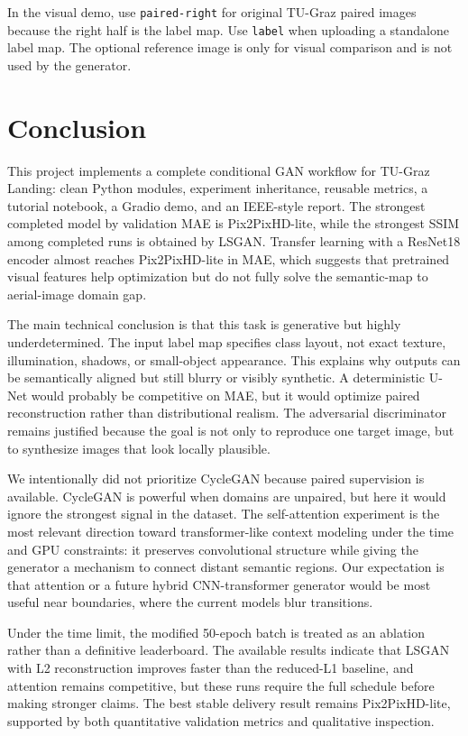 \documentclass[conference]{IEEEtran}
\newcommand{\code}[1]{\texttt{#1}}
\begin{document}
In the visual demo, use \code{paired-right} for original TU-Graz paired images because the right half is the label map. Use \code{label} when uploading a standalone label map. The optional reference image is only for visual comparison and is not used by the generator.


\section{Conclusion}
This project implements a complete conditional GAN workflow for TU-Graz Landing: clean Python modules, experiment inheritance, reusable metrics, a tutorial notebook, a Gradio demo, and an IEEE-style report. The strongest completed model by validation MAE is Pix2PixHD-lite, while the strongest SSIM among completed runs is obtained by LSGAN. Transfer learning with a ResNet18 encoder almost reaches Pix2PixHD-lite in MAE, which suggests that pretrained visual features help optimization but do not fully solve the semantic-map to aerial-image domain gap.

The main technical conclusion is that this task is generative but highly underdetermined. The input label map specifies class layout, not exact texture, illumination, shadows, or small-object appearance. This explains why outputs can be semantically aligned but still blurry or visibly synthetic. A deterministic U-Net would probably be competitive on MAE, but it would optimize paired reconstruction rather than distributional realism. The adversarial discriminator remains justified because the goal is not only to reproduce one target image, but to synthesize images that look locally plausible.

We intentionally did not prioritize CycleGAN because paired supervision is available. CycleGAN is powerful when domains are unpaired, but here it would ignore the strongest signal in the dataset. The self-attention experiment is the most relevant direction toward transformer-like context modeling under the time and GPU constraints: it preserves convolutional structure while giving the generator a mechanism to connect distant semantic regions. Our expectation is that attention or a future hybrid CNN-transformer generator would be most useful near boundaries, where the current models blur transitions.

Under the time limit, the modified 50-epoch batch is treated as an ablation rather than a definitive leaderboard. The available results indicate that LSGAN with L2 reconstruction improves faster than the reduced-L1 baseline, and attention remains competitive, but these runs require the full schedule before making stronger claims. The best stable delivery result remains Pix2PixHD-lite, supported by both quantitative validation metrics and qualitative inspection.
\end{document}
